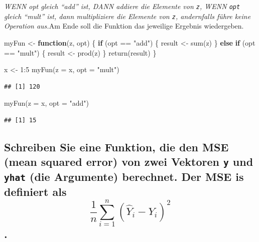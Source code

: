 \documentclass[12pt,a4paper]{article}
\newenvironment{Shaded}{\begin{snugshade}}{\end{snugshade}}
\newcommand{\AttributeTok}[1]{\textcolor[rgb]{0.77,0.63,0.00}{#1}}
\newcommand{\ControlFlowTok}[1]{\textcolor[rgb]{0.13,0.29,0.53}{\textbf{#1}}}
\newcommand{\DecValTok}[1]{\textcolor[rgb]{0.00,0.00,0.81}{#1}}
\newcommand{\FunctionTok}[1]{\textcolor[rgb]{0.00,0.00,0.00}{#1}}
\newcommand{\NormalTok}[1]{#1}
\newcommand{\OtherTok}[1]{\textcolor[rgb]{0.56,0.35,0.01}{#1}}
\newcommand{\SpecialCharTok}[1]{\textcolor[rgb]{0.00,0.00,0.00}{#1}}
\newcommand{\StringTok}[1]{\textcolor[rgb]{0.31,0.60,0.02}{#1}}
\begin{document}
\emph{WENN opt gleich ``add'' ist, DANN addiere die Elemente von
\texttt{z}, WENN \texttt{opt} gleich ``mult'' ist, dann multipliziere
die Elemente von \texttt{z}, andernfalls führe keine Operation
aus.}\newline\newline Am Ende soll die Funktion das jeweilige Ergebnis
wiedergeben.

\begin{Shaded}
\begin{Highlighting}[]
\NormalTok{    myFun }\OtherTok{\textless{}{-}} \ControlFlowTok{function}\NormalTok{(z, opt) \{}
      \ControlFlowTok{if}\NormalTok{ (opt }\SpecialCharTok{==} \StringTok{"add"}\NormalTok{) \{}
\NormalTok{        result }\OtherTok{\textless{}{-}} \FunctionTok{sum}\NormalTok{(z)}
\NormalTok{      \} }\ControlFlowTok{else} \ControlFlowTok{if}\NormalTok{ (opt }\SpecialCharTok{==} \StringTok{"mult"}\NormalTok{) \{}
\NormalTok{        result }\OtherTok{\textless{}{-}} \FunctionTok{prod}\NormalTok{(z)}
\NormalTok{      \}}
      \FunctionTok{return}\NormalTok{(result)}
\NormalTok{    \}}
    
\NormalTok{    x }\OtherTok{\textless{}{-}} \DecValTok{1}\SpecialCharTok{:}\DecValTok{5}
    \FunctionTok{myFun}\NormalTok{(}\AttributeTok{z =}\NormalTok{ x, }\AttributeTok{opt =} \StringTok{"mult"}\NormalTok{)}
\end{Highlighting}
\end{Shaded}

\begin{verbatim}
## [1] 120
\end{verbatim}

\begin{Shaded}
\begin{Highlighting}[]
    \FunctionTok{myFun}\NormalTok{(}\AttributeTok{z =}\NormalTok{ x, }\AttributeTok{opt =} \StringTok{"add"}\NormalTok{)}
\end{Highlighting}
\end{Shaded}

\begin{verbatim}
## [1] 15
\end{verbatim}

\hypertarget{schreiben-sie-eine-funktion-die-den-mse-mean-squared-error-von-zwei-vektoren-y-und-yhat-die-argumente-berechnet.-der-mse-is-definiert-als-displaystyle-frac1nsum_i1n-haty_i---y_i2.}{%
\subsection{\texorpdfstring{Schreiben Sie eine Funktion, die den MSE
(mean squared error) von zwei Vektoren \texttt{y} und \texttt{yhat} (die
Argumente) berechnet. Der MSE is definiert als
\[\displaystyle \frac{1}{n}\sum_{i=1}^n (\hat{Y}_i - Y_i)^2\].}{Schreiben Sie eine Funktion, die den MSE (mean squared error) von zwei Vektoren y und yhat (die Argumente) berechnet. Der MSE is definiert als \textbackslash displaystyle \textbackslash frac\{1\}\{n\}\textbackslash sum\_\{i=1\}\^{}n (\textbackslash hat\{Y\}\_i - Y\_i)\^{}2.}}\label{schreiben-sie-eine-funktion-die-den-mse-mean-squared-error-von-zwei-vektoren-y-und-yhat-die-argumente-berechnet.-der-mse-is-definiert-als-displaystyle-frac1nsum_i1n-haty_i---y_i2.}}
\end{document}
